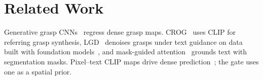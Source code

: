 \section{Related Work}
Generative grasp CNNs~\cite{morrison2018closing,kumra2020antipodal} regress dense grasp maps. CROG~\cite{tziafas2023language} uses CLIP for referring grasp synthesis, LGD~\cite{vuong2024language} denoises grasps under text guidance on data built with foundation models~\cite{vuong2024grasp}, and mask-guided attention~\cite{vo2024language} grounds text with segmentation masks. Pixel--text CLIP maps drive dense prediction~\cite{zhou2022extract}; the gate uses one as a spatial prior.
